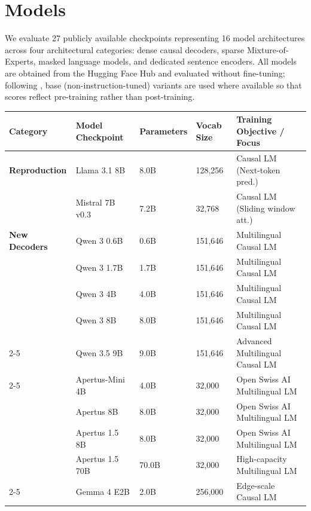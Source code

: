 \section{Models}
\label{sec:models}

We evaluate 27 publicly available checkpoints representing 16 model architectures across four architectural categories: dense causal decoders, sparse Mixture-of-Experts, masked language models, and dedicated sentence encoders. All models are obtained from the Hugging Face Hub and evaluated without fine-tuning; following \citet{kargaran2025mexa}, base (non-instruction-tuned) variants are used where available so that scores reflect pre-training rather than post-training.

\begin{table}[!htbp]
\centering
\footnotesize
\renewcommand{\arraystretch}{0.92}
\setlength{\tabcolsep}{4pt}
\begin{tabularx}{\textwidth}{@{}p{2.6cm} p{3.2cm} p{1.7cm} p{1.5cm} X@{}}
\toprule
\textbf{Category} & \textbf{Model Checkpoint} & \textbf{Parameters} & \textbf{Vocab Size} & \textbf{Training Objective / Focus} \\
\midrule
\textbf{Reproduction}
  & Llama 3.1 8B & 8.0B & 128,256 & Causal LM (Next-token pred.) \\
  & Mistral 7B v0.3 & 7.2B & 32,768 & Causal LM (Sliding window att.) \\
\midrule
\textbf{New Decoders}
  & Qwen 3 0.6B & 0.6B & 151,646 & Multilingual Causal LM \\
  & Qwen 3 1.7B & 1.7B & 151,646 & Multilingual Causal LM \\
  & Qwen 3 4B & 4.0B & 151,646 & Multilingual Causal LM \\
  & Qwen 3 8B & 8.0B & 151,646 & Multilingual Causal LM \\
  \cmidrule(lr){2-5}
  & Qwen 3.5 9B & 9.0B & 151,646 & Advanced Multilingual Causal LM \\
  \cmidrule(lr){2-5}
  & Apertus-Mini 4B & 4.0B & 32,000 & Open Swiss AI Multilingual LM \\
  & Apertus 8B & 8.0B & 32,000 & Open Swiss AI Multilingual LM \\
  & Apertus 1.5 8B & 8.0B & 32,000 & Open Swiss AI Multilingual LM \\
  & Apertus 1.5 70B & 70.0B & 32,000 & High-capacity Multilingual LM \\
  \cmidrule(lr){2-5}
  & Gemma 4 E2B & 2.0B & 256,000 & Edge-scale Causal LM \\

\end{tabularx}
\end{table}
